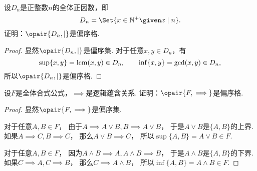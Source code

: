 \begin{example}
设\(D_n\)是正整数\(n\)的全体正因数，即\[
	D_n = \Set{ x\in\mathbb{N}^+ \given x \mid n }.
\]
证明：\(\opair{D_n,\mid}\)是偏序格.
\begin{proof}
显然\(\opair{D_n,\mid}\)是偏序集.
对于任意\(x,y \in D_n\)，有\[
	\sup\{x,y\}
	= \operatorname{lcm}(x,y)
	\in D_n,
	\qquad
	\inf\{x,y\}
	= \operatorname{gcd}(x,y)
	\in D_n,
\]
所以\(\opair{D_n,\mid}\)是偏序格.
\end{proof}
\end{example}

\begin{example}
设\(F\)是全体合式公式，\(\implies\)是逻辑蕴含关系.
证明：\(\opair{F,\implies}\)是偏序格.
\begin{proof}
显然\(\opair{F,\implies}\)是偏序集.

对于任意\(A,B \in F\)，
由于\(A \implies A \lor B,
B \implies A \lor B\)，
于是\(A \lor B\)是\(\{A,B\}\)的上界.
如果\(A \implies C,
B \implies C\)，
那么\(A \lor B \implies C\)，
所以\(\sup\{A,B\}
= A \lor B
\in F\).

对于任意\(A,B \in F\)，
因为\(A \land B \implies A,
A \land B \implies B\)，
于是\(A \land B\)是\(\{A,B\}\)的下界.
如果\(C \implies A,
C \implies B\)，
那么\(C \implies A \land B\)，
所以\(\inf\{A,B\}
= A \land B
\in F\).
\end{proof}
\end{example}
